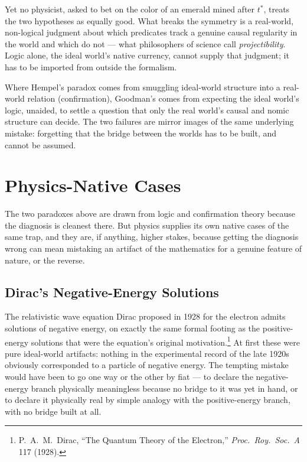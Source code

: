 \documentclass[11pt]{book}
\begin{document}
Yet no physicist, asked to bet on the color of an emerald mined after $t^\ast$, treats the two hypotheses as equally good. What breaks the symmetry is a real-world, non-logical judgment about which predicates track a genuine causal regularity in the world and which do not --- what philosophers of science call \emph{projectibility}. Logic alone, the ideal world's native currency, cannot supply that judgment; it has to be imported from outside the formalism.

Where Hempel's paradox comes from smuggling ideal-world structure into a real-world relation (confirmation), Goodman's comes from expecting the ideal world's logic, unaided, to settle a question that only the real world's causal and nomic structure can decide. The two failures are mirror images of the same underlying mistake: forgetting that the bridge between the worlds has to be built, and cannot be assumed.

\section{Physics-Native Cases}

The two paradoxes above are drawn from logic and confirmation theory because the diagnosis is cleanest there. But physics supplies its own native cases of the same trap, and they are, if anything, higher stakes, because getting the diagnosis wrong can mean mistaking an artifact of the mathematics for a genuine feature of nature, or the reverse.

\subsection{Dirac's Negative-Energy Solutions}

The relativistic wave equation Dirac proposed in 1928 for the electron admits solutions of negative energy, on exactly the same formal footing as the positive-energy solutions that were the equation's original motivation.\footnote{P.\ A.\ M.\ Dirac, ``The Quantum Theory of the Electron,'' \emph{Proc.\ Roy.\ Soc.\ A} 117 (1928).} At first these were pure ideal-world artifacts: nothing in the experimental record of the late 1920s obviously corresponded to a particle of negative energy. The tempting mistake would have been to go one way or the other by fiat --- to declare the negative-energy branch physically meaningless because no bridge to it was yet in hand, or to declare it physically real by simple analogy with the positive-energy branch, with no bridge built at all.
\end{document}
